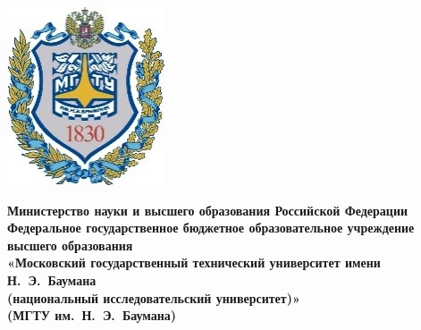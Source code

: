 \begin{titlepage}
	\fontsize{12pt}{12pt}\selectfont
	\noindent \begin{minipage}{0.15\textwidth}
		\includegraphics[width=\linewidth]{img/b_logo.jpg}
	\end{minipage}
	\noindent\begin{minipage}{0.9\textwidth}\centering
		\textbf{Министерство науки и высшего образования Российской Федерации}\\
		\textbf{Федеральное государственное бюджетное образовательное учреждение высшего образования}\\
		\textbf{«Московский государственный технический университет имени Н.~Э.~Баумана}\\
		\textbf{(национальный исследовательский университет)»}\\
		\textbf{(МГТУ им.~Н.~Э.~Баумана)}
	\end{minipage}

    \begin{center}
        \fontsize{12pt}{0.1\baselineskip}\selectfont
        \noindent\makebox{\rule{18cm}{4pt}} 
        \noindent\makebox{\rule{18cm}{1pt}}
    \end{center}


\end{titlepage}
